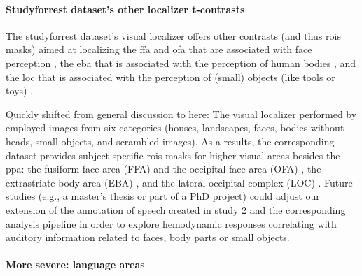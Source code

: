 \paragraph{Studyforrest dataset's other localizer t-contrasts}





The studyforrest dataset's visual localizer \citep{sengupta2016extension} offers
other contrasts (and thus \acp{roi} masks) aimed at localizing the \ac{ffa} and
\ac{ofa} that are associated with face perception \citep{kanwisher1997ffa,
pitcher2011occipitalfacearea}, the \ac{eba} that is associated with the
perception of human bodies \citep{downing2001bodyarea}, and the \ac{loc} that is
associated with the perception of (small) objects (like tools or toys)
\citep{malach1995loc}.

Quickly shifted from general discussion to here:
%
The visual localizer performed by \citet{sengupta2016extension} employed images
from six categories (houses, landscapes, faces, bodies without heads, small
objects, and scrambled images).
%
As a results, the corresponding dataset provides subject-specific \acp{roi}
masks for higher visual areas besides the \ac{ppa}:
%
the fusiform face area (FFA) \citep{kanwisher1997ffa} and the occipital face
area (OFA) \citep{pitcher2011occipitalfacearea},
%
the extrastriate body area (EBA) \citep{downing2001bodyarea},
%
and the lateral occipital complex (LOC) \citep{malach1995loc}.
%
Future studies (e.g., a master's thesis or part of a PhD project) could adjust
our extension of the annotation of speech created in study 2 and the
corresponding analysis pipeline in order to explore hemodynamic responses
correlating with auditory information related to faces, body parts or small
objects.



\paragraph{More severe: language areas}


